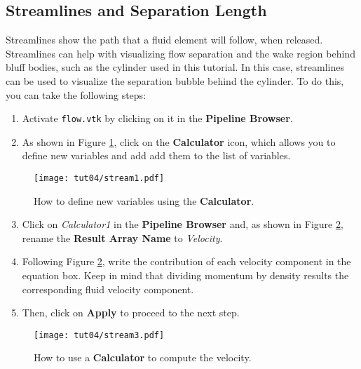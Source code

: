 \subsection{Streamlines and Separation Length}
Streamlines show the path that a fluid element will follow, when released. Streamlines can help with visualizing flow separation and the wake region behind bluff bodies, such as the cylinder used in this tutorial. In this case, streamlines can be used to visualize the separation bubble behind the cylinder. To do this, you can take the following steps:
\begin{enumerate}[label=\arabic*)]
	\setcounter{enumi}{0}
	\item Activate \texttt{flow.vtk} by clicking on it in the \textbf{Pipeline Browser}.
	\item As shown in Figure \ref{fig4:stream1_4}, click on the \textbf{Calculator} icon, which allows you to define new variables and add add them to the list of variables.
\end{enumerate}
\begin{figure}[ht]
	\centering
	\texttt{[image: tut04/stream1.pdf]}
	\caption{How to define new variables using the \textbf{Calculator}.}
	\label{fig4:stream1_4}
\end{figure}
\begin{enumerate}[label=\arabic*)]
	\setcounter{enumi}{2}
	\item Click on \textit{Calculator1} in the \textbf{Pipeline Browser} and, as shown in Figure \ref{fig4:stream3_4}, rename the \textbf{Result Array Name} to \textit{Velocity}.
	\item Following Figure \ref{fig4:stream3_4}, write the contribution of each velocity component in the equation box. Keep in mind that dividing momentum by density results the corresponding fluid velocity component.
	\item Then, click on \textbf{Apply} to proceed to the next step.
\end{enumerate} 
\begin{figure}[ht]
    \centering
    \texttt{[image: tut04/stream3.pdf]}
    \caption{How to use a \textbf{Calculator} to compute the velocity.}
    \label{fig4:stream3_4}
\end{figure}
